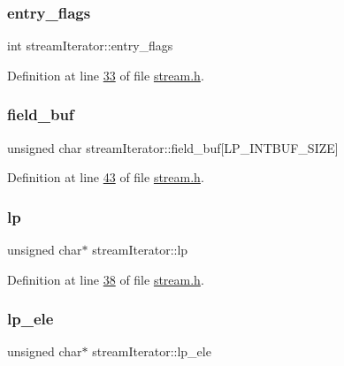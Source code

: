 \subsubsection{\texorpdfstring{entry\+\_\+flags}{entry\_flags}}
{\footnotesize\ttfamily int stream\+Iterator\+::entry\+\_\+flags}



Definition at line \hyperlink{stream_8h_source_l00033}{33} of file \hyperlink{stream_8h_source}{stream.\+h}.

\mbox{\label{structstreamIterator_a5b72cdb1785d955fe0c619863d5f4733}} 
\subsubsection{\texorpdfstring{field\+\_\+buf}{field\_buf}}
{\footnotesize\ttfamily unsigned char stream\+Iterator\+::field\+\_\+buf\mbox{[}L\+P\+\_\+\+I\+N\+T\+B\+U\+F\+\_\+\+S\+I\+ZE\mbox{]}}



Definition at line \hyperlink{stream_8h_source_l00043}{43} of file \hyperlink{stream_8h_source}{stream.\+h}.

\mbox{\label{structstreamIterator_a785e537f2475957006152dcfba73814c}} 
\subsubsection{\texorpdfstring{lp}{lp}}
{\footnotesize\ttfamily unsigned char$\ast$ stream\+Iterator\+::lp}



Definition at line \hyperlink{stream_8h_source_l00038}{38} of file \hyperlink{stream_8h_source}{stream.\+h}.

\mbox{\label{structstreamIterator_a0312badd5369a7d5062361e8e54e0269}} 
\subsubsection{\texorpdfstring{lp\+\_\+ele}{lp\_ele}}
{\footnotesize\ttfamily unsigned char$\ast$ stream\+Iterator\+::lp\+\_\+ele}



